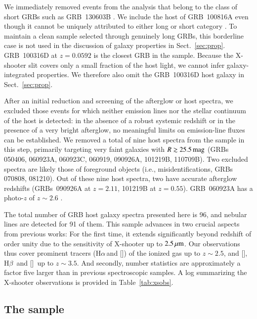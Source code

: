 \documentclass[traditabstract, longauth]{aa}
\newcommand{\hb}{H$\beta$}
\newcommand{\ha}{H$\alpha$}
\newcommand{\oii}{[\ion{O}{ii}]}
\newcommand{\oiii}{[\ion{O}{iii}]}
\newcommand{\nii}{[\ion{N}{ii}]}
\begin{document}
We immediately removed events from the analysis that belong to the class of short GRBs such as GRB~130603B \citep[e.g.,][]{2014A&A...563A..62D}. We include the host of GRB~100816A even though it cannot be uniquely attributed to either long or short category \citep{2010GCNR..300....1O}. To maintain a clean sample selected through genuinely long GRBs, this borderline case is not used in the discussion of galaxy properties in Sect.~\ref{sec:prop}. GRB~100316D at $z=0.0592$ \citep[e.g.,][]{2011MNRAS.411.2792S, 2012ApJ...753...67B} is the closest GRB in the sample. Because the X-shooter slit covers only a small fraction of the host light, we cannot infer galaxy-integrated properties. We therefore also omit the GRB~100316D host galaxy in Sect.~\ref{sec:prop}.

After an initial reduction and screening of the afterglow or host spectra, we excluded those events for which neither emission lines nor the stellar continuum of the host is detected: in the absence of a robust systemic redshift or in the presence of a very bright afterglow, no meaningful limits on emission-line fluxes can be established.  {We removed a total of nine host spectra from the sample in this step, primarily targeting very faint galaxies with $R\gtrsim25.5\,\rm{mag}$ (GRBs 050406, 060923A, 060923C, 060919, 090926A, 101219B, 110709B). Two excluded spectra are likely those of foreground objects (i.e., misidentifications, GRBs 070808, 081210). Out of these nine host spectra, two have accurate afterglow redshifts (GRBs~090926A at $z=2.11$, 101219B at $z=0.55$). GRB~060923A has a photo-$z$ of $z\sim2.6$ \citep{2008MNRAS.388.1743T, 2013ApJ...778..128P}.}

The total number of GRB host galaxy spectra presented here is 96, and nebular lines are detected for 91 of them. This sample advances in two crucial aspects from previous works: For the first time, it extends significantly beyond redshift of order unity due to the sensitivity of X-shooter up to $2.5\,\rm{\mu m}$. Our observations thus cover prominent tracers (\ha\,and \nii) of the ionized gas up to $z\sim2.5$, and \oii, \hb\, and \oiii\, up to $z\sim3.5$. And secondly, number statistics are approximately a factor five larger than in previous spectroscopic samples. A log summarizing the X-shooter observations is provided in Table~\ref{tab:xsobs}.

\subsection{The sample}
\end{document}
